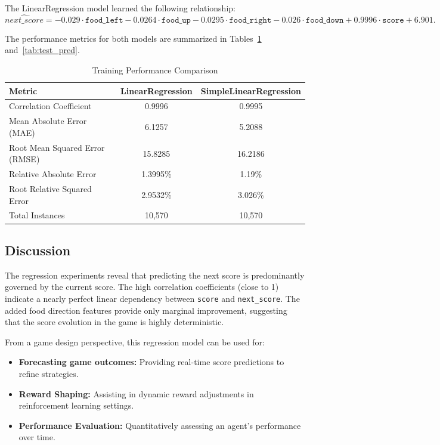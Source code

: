 \documentclass[12pt,a4paper]{article}
\begin{document}
The LinearRegression model learned the following relationship:
\[
\hat{next\_score} = -0.029\cdot \texttt{food\_left} - 0.0264\cdot \texttt{food\_up} 
- 0.0295\cdot \texttt{food\_right} - 0.026\cdot \texttt{food\_down} 
+ 0.9996\cdot \texttt{score} + 6.901.
\]

The performance metrics for both models are summarized in Tables~\ref{tab:train_pred} and~\ref{tab:test_pred}.


\begin{table}[ht]
    \caption{Training Performance Comparison}
    \label{tab:train_pred}
    \begin{tabular}{lcc}
        \toprule
        Metric & LinearRegression & SimpleLinearRegression \\
        \midrule
        Correlation Coefficient & 0.9996 & 0.9995 \\
        Mean Absolute Error (MAE) & 6.1257 & 5.2088 \\
        Root Mean Squared Error (RMSE) & 15.8285 & 16.2186 \\
        Relative Absolute Error & 1.3995\% & 1.19\% \\
        Root Relative Squared Error & 2.9532\% & 3.026\% \\
        Total Instances & 10,570 & 10,570 \\
        \bottomrule
    \end{tabular}
\end{table}

\subsection{Discussion}

The regression experiments reveal that predicting the next score is predominantly governed by the current score. The high correlation coefficients (close to 1) indicate a nearly perfect linear dependency between \texttt{score} and \texttt{next\_score}. The added food direction features provide only marginal improvement, suggesting that the score evolution in the game is highly deterministic.

From a game design perspective, this regression model can be used for:
\begin{itemize}
    \item \textbf{Forecasting game outcomes:} Providing real-time score predictions to refine strategies.
    \item \textbf{Reward Shaping:} Assisting in dynamic reward adjustments in reinforcement learning settings.
    \item \textbf{Performance Evaluation:} Quantitatively assessing an agent's performance over time.
\end{itemize}
\end{document}
